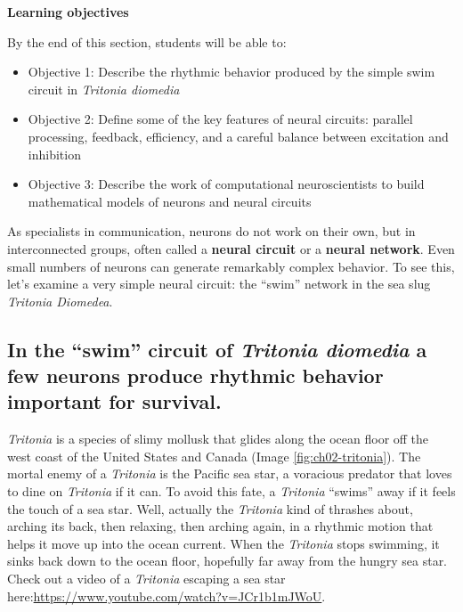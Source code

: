 \documentclass[
]{book}
\begin{document}
\textbf{Learning objectives}

By the end of this section, students will be able to:

\begin{itemize}
\item
  Objective 1: Describe the rhythmic behavior produced by the simple swim circuit in \emph{Tritonia diomedia}
\item
  Objective 2: Define some of the key features of neural circuits: parallel processing, feedback, efficiency, and a careful balance between excitation and inhibition
\item
  Objective 3: Describe the work of computational neuroscientists to build mathematical models of neurons and neural circuits
\end{itemize}

As specialists in communication, neurons do not work on their own, but in interconnected groups, often called a \textbf{neural circuit} or a \textbf{neural network}. Even small numbers of neurons can generate remarkably complex behavior. To see this, let's examine a very simple neural circuit: the ``swim'' network in the sea slug \emph{Tritonia Diomedea}.

\hypertarget{in-the-swim-circuit-of-tritonia-diomedia-a-few-neurons-produce-rhythmic-behavior-important-for-survival.}{%
\subsection{\texorpdfstring{In the ``swim'' circuit of \emph{Tritonia diomedia} a few neurons produce rhythmic behavior important for survival.}{In the ``swim'' circuit of Tritonia diomedia a few neurons produce rhythmic behavior important for survival.}}\label{in-the-swim-circuit-of-tritonia-diomedia-a-few-neurons-produce-rhythmic-behavior-important-for-survival.}}

\emph{Tritonia} is a species of slimy mollusk that glides along the ocean floor off the west coast of the United States and Canada (Image \ref{fig:ch02-tritonia}). The mortal enemy of a \emph{Tritonia} is the Pacific sea star, a voracious predator that loves to dine on \emph{Tritonia} if it can. To avoid this fate, a \emph{Tritonia} ``swims'' away if it feels the touch of a sea star. Well, actually the \emph{Tritonia} kind of thrashes about, arching its back, then relaxing, then arching again, in a rhythmic motion that helps it move up into the ocean current. When the \emph{Tritonia} stops swimming, it sinks back down to the ocean floor, hopefully far away from the hungry sea star. Check out a video of a \emph{Tritonia} escaping a sea star here:\url{https://www.youtube.com/watch?v=JCr1b1mJWoU}.
\end{document}
